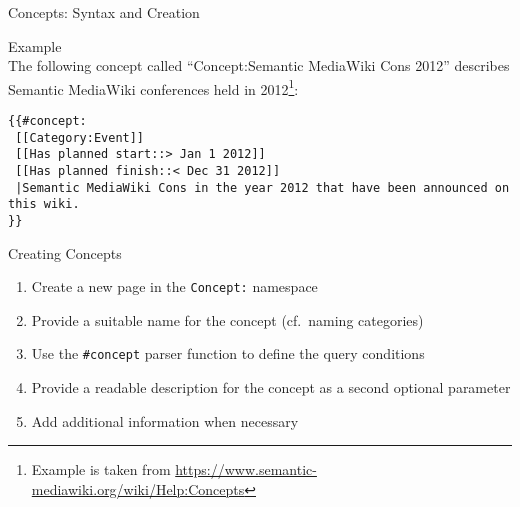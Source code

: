 \documentclass[aspectratio=1610,onlymath]{beamer}
\begin{document}
\begin{frame}[fragile]{Concepts: Syntax and Creation}


\alert{Example} \\
The following concept called ``Concept:Semantic MediaWiki Cons 2012'' describes Semantic MediaWiki conferences held in 2012\footnote{Example is taken from \url{https://www.semantic-mediawiki.org/wiki/Help:Concepts}}:


\begin{lstlisting}
{{#concept:
 [[Category:Event]]
 [[Has planned start::> Jan 1 2012]]
 [[Has planned finish::< Dec 31 2012]] 
 |Semantic MediaWiki Cons in the year 2012 that have been announced on this wiki.
}}
\end{lstlisting}



\alert{Creating Concepts}

\begin{enumerate}
	\item Create a new page in the \texttt{Concept:} namespace
	\item Provide a suitable name for the concept (cf.\ naming categories)
	\item Use the \texttt{\#concept} parser function to define the query conditions
	\item Provide a readable description for the concept as a second optional parameter
	\item Add additional information when necessary
\end{enumerate}

\end{frame}
\end{document}
